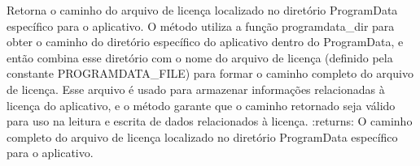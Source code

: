 \documentclass[letterpaper,10pt,english]{sphinxmanual}
\begin{document}
\begin{fulllineitems}
\label{\detokenize{api/simple_lock:simple_lock.license_path_programdata}}
\pysigstartsignatures
\pysiglinewithargsret
{}
{}
{}
\pysigstopsignatures
\sphinxAtStartPar
Retorna o caminho do arquivo de licença localizado no diretório ProgramData específico para o aplicativo. O método utiliza a função programdata\_dir para obter o caminho do diretório específico do aplicativo dentro do ProgramData, e então combina esse diretório com o nome do arquivo de licença (definido pela constante PROGRAMDATA\_FILE) para formar o caminho completo do arquivo de licença. Esse arquivo é usado para armazenar informações relacionadas à licença do aplicativo, e o método garante que o caminho retornado seja válido para uso na leitura e escrita de dados relacionados à licença.
:returns: O caminho completo do arquivo de licença localizado no diretório ProgramData específico para o aplicativo.
\begin{quote}\begin{description}
\sphinxAtStartPar
{}

\end{description}\end{quote}

\end{fulllineitems}

\end{document}
